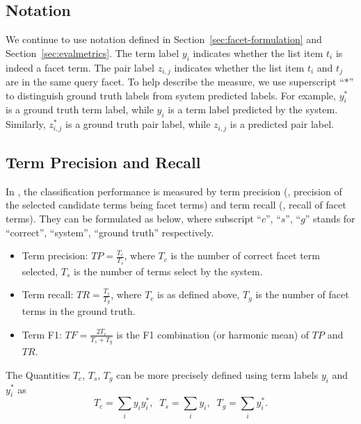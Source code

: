 \subsection{Notation}
We continue to use notation defined in Section~\ref{sec:facet-formulation} and Section~\ref{sec:evalmetrics}. The term label $y_i$ indicates whether the list item $t_i$ is indeed a facet term. The pair label $z_{i,j}$ indicates whether the list item $t_i$ and $t_j$ are in the same query facet. To help describe the measure, we use superscript ``$*$'' to distinguish ground truth labels from system predicted labels. For example, $y_i^*$ is a ground truth term label, while $y_i$ is a term label predicted by the system. Similarly, $z_{i,j}^*$ is a ground truth pair label, while $z_{i,j}$ is a predicted pair label. 

\subsection{Term Precision and Recall}
In \PRF, the classification performance is measured by term precision (\ie, precision of the selected candidate terms being facet terms) and term recall (\ie, recall of facet terms).  They can be formulated as below, where subscript ``$c$'', ``$s$'', ``$g$'' stands for ``correct'', ``system'', ``ground truth'' respectively.
\begin{itemize}
 \item Term precision: $T\!P = \frac{T_c}{T_s}$, where $T_c$ is the number of correct facet term selected, $T_s$ is the number of terms select by the system. 
 \item Term recall: $T\!R = \frac{T_c}{T_g}$, where $T_c$ is as defined above, $T_g$ is the number of facet terms in the ground truth.
 \item Term F1: $T\!F=\frac{2T_c}{T_s+T_g}$ is the F1 combination (or harmonic mean) of $T\!P$ and $T\!R$.
\end{itemize}

The Quantities $T_c$, $T_s$, $T_g$ can be more precisely defined using term labels $y_i$ and $y_i^{*}$ as
\begin{equation}
\label{eq:qterm}
 T_c=\sum_i{y_iy_i^{*}}, \;\; T_s=\sum_i{y_i}, \;\; T_g=\sum_i{y_i^{*}}.
\end{equation}

